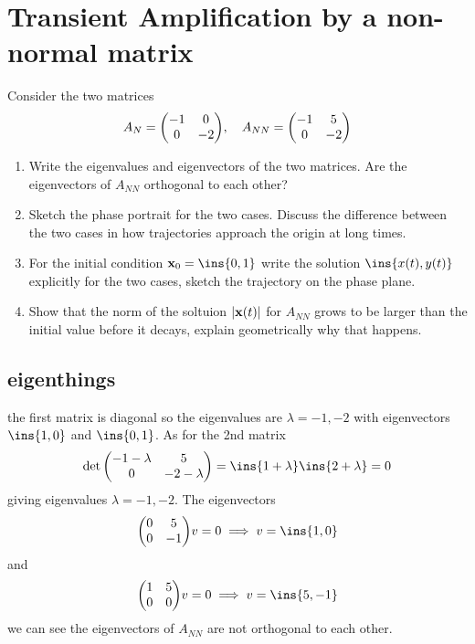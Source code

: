 \clearpage
\section{Transient Amplification by a non-normal matrix}
\begin{colbox}
    Consider the two matrices
    \begin{equation}
        A_N = \mqty(-1&0\\0&-2),\quad A_{NN}=\mqty(-1&5\\0&-2)
    \end{equation}
    \begin{enumerate}
        \item Write the eigenvalues and eigenvectors of the two matrices. Are the eigenvectors of \(A_{NN}\) orthogonal to each other?
        \item Sketch the phase portrait for the two cases. Discuss the difference between the two cases in how trajectories approach the origin at long times.
        \item For the initial condition \(\vb{x}_0=\ins{0,1}\) write the solution \(\ins{x(t),y(t)}\) explicitly for the two cases, sketch the trajectory on the phase plane.
        \item Show that the norm of the soltuion \(\abs{\vb{x}(t)}\) for \(A_{NN}\) grows to be larger than the initial value before it decays, explain geometrically why that happens.
    \end{enumerate}
\end{colbox}
\subsection{eigenthings}
the first matrix is diagonal so the eigenvalues are \(\lambda = -1,-2\) with eigenvectors \(\ins{1,0}\) and \(\ins{0,1}\). As for the 2nd matrix 
\begin{equation}
    \det\mqty(-1-\lambda & 5\\0 & -2-\lambda)=\ins{1+\lambda}\ins{2+\lambda}=0
\end{equation}
giving eigenvalues \(\lambda = -1,-2\). The eigenvectors 
\begin{equation}
    \mqty(0&5\\0&-1)v=0 \implies v=\ins{1,0}
\end{equation}
and 
\begin{equation}
    \mqty(1&5\\0&0)v=0 \implies v=\ins{5,-1}
\end{equation}
we can see the eigenvectors of \(A_{NN}\) are not orthogonal to each other.
